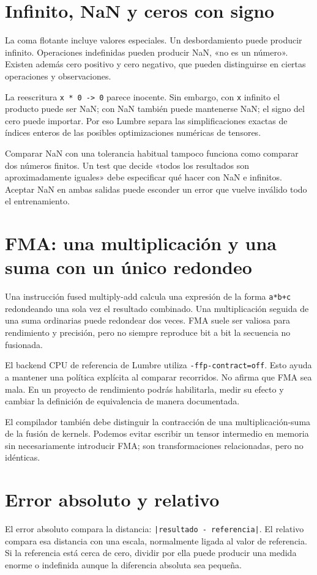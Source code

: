 \documentclass[12pt,a4paper,oneside]{report}
\begin{document}
\section{Infinito, NaN y ceros con signo}
La coma flotante incluye valores especiales. Un desbordamiento puede producir infinito. Operaciones indefinidas pueden producir NaN, «no es un número». Existen además cero positivo y cero negativo, que pueden distinguirse en ciertas operaciones y observaciones.

La reescritura \texttt{x * 0 -> 0} parece inocente. Sin embargo, con \texttt{x} infinito el producto puede ser NaN; con NaN también puede mantenerse NaN; el signo del cero puede importar. Por eso Lumbre separa las simplificaciones exactas de índices enteros de las posibles optimizaciones numéricas de tensores.

Comparar NaN con una tolerancia habitual tampoco funciona como comparar dos números finitos. Un test que decide «todos los resultados son aproximadamente iguales» debe especificar qué hacer con NaN e infinitos. Aceptar NaN en ambas salidas puede esconder un error que vuelve inválido todo el entrenamiento.

\section{FMA: una multiplicación y una suma con un único redondeo}
Una instrucción fused multiply-add calcula una expresión de la forma \texttt{a*b+c} redondeando una sola vez el resultado combinado. Una multiplicación seguida de una suma ordinarias puede redondear dos veces. FMA suele ser valiosa para rendimiento y precisión, pero no siempre reproduce bit a bit la secuencia no fusionada. \cite{ieee-nvidia}

El backend CPU de referencia de Lumbre utiliza \texttt{-ffp-contract=off}. Esto ayuda a mantener una política explícita al comparar recorridos. No afirma que FMA sea mala. En un proyecto de rendimiento podrás habilitarla, medir su efecto y cambiar la definición de equivalencia de manera documentada.

El compilador también debe distinguir la contracción de una multiplicación-suma de la fusión de kernels. Podemos evitar escribir un tensor intermedio en memoria sin necesariamente introducir FMA; son transformaciones relacionadas, pero no idénticas.

\section{Error absoluto y relativo}
El error absoluto compara la distancia: \texttt{|resultado -\allowbreak{} referencia|}. El relativo compara esa distancia con una escala, normalmente ligada al valor de referencia. Si la referencia está cerca de cero, dividir por ella puede producir una medida enorme o indefinida aunque la diferencia absoluta sea pequeña.
\end{document}
